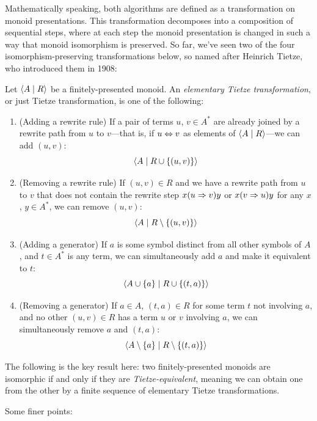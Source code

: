 \documentclass[../generics]{subfiles}
\begin{document}
Mathematically speaking, both algorithms are defined as a transformation on monoid presentations. This transformation decomposes into a composition of sequential steps, where at each step the monoid presentation is changed in such a way that monoid isomorphism is preserved. So far, we've seen two of the four isomorphism-preserving transformations below, so named after Heinrich Tietze, who introduced them in 1908:
\begin{definition}
Let $\langle A \mid R\rangle$ be a finitely-presented monoid. An \emph{elementary Tietze transformation}, or just Tietze transformation, is one of the following:
\begin{enumerate}
\item (Adding a rewrite rule) If a pair of terms $u$, $v\in A^*$ are already joined by a rewrite path from $u$ to $v$---that is, if $u\Leftrightarrow v$ as elements of $\langle A \mid R\rangle$---we can add $(u,v)$:
\[\langle A \mid R\cup\{(u,v)\}\rangle\]
\item (Removing a rewrite rule) If $(u,v)\in R$ and we have a rewrite path from $u$ to $v$ that does not contain the rewrite step $x(u\Rightarrow v)y$ or $x(v\Rightarrow u)y$ for any $x$, $y\in A^*$, we can remove $(u,v)$:
\[\langle A \mid R\setminus\{(u,v)\}\rangle\]
\item (Adding a generator) If $a$ is some symbol distinct from all other symbols of $A$, and $t\in A^*$ is any term, we can simultaneously add $a$ and make it equivalent to $t$:
\[\langle A\cup\{a\} \mid R\cup\{(t,a)\}\rangle\]
\item (Removing a generator) If $a\in A$, $(t,a)\in R$ for some term $t$ not involving $a$, and no other $(u,v)\in R$ has a term $u$ or $v$ involving $a$, we can simultaneously remove $a$ and $(t,a)$:
\[\langle A\setminus\{a\} \mid R\setminus\{(t,a)\}\rangle\]
\end{enumerate}
The following is the key result here: two finitely-presented monoids are isomorphic if and only if they are \emph{Tietze-equivalent}, meaning we can obtain one from the other by a finite sequence of elementary Tietze transformations.
\end{definition}
Some finer points:
\end{document}
